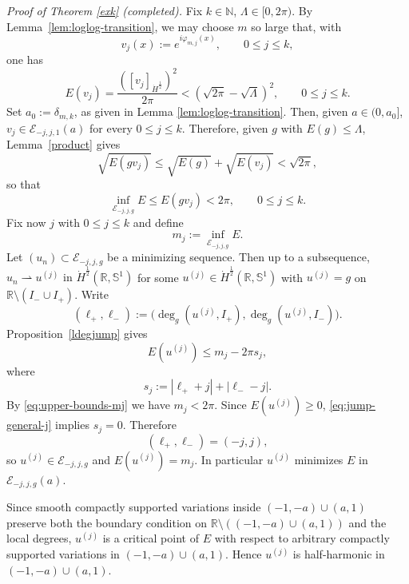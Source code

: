 \documentclass[12pt, a4paper]{article}
\newcommand{\sph}{\mathbb{S}}
\newcommand{\R}{\mathbb{R}}
\newcommand{\blu}[1]{{\color{blue}#1}}
\newcommand{\red}[1]{{\color{red}#1}}
\renewcommand{\(}{\left(}
\renewcommand{\)}{\right)}
\begin{document}
\medskip

\noindent\emph{Proof of Theorem \ref{exk} (completed).}
Fix $k\in\mathbb N$, $\Lambda\in [0,2\pi)$. By Lemma~\ref{lem:loglog-transition}, we may choose $m$ so large that, with
\[
 v_j(x):=e^{i\varphi_{m,j}(x)},\qquad 0\le j\le k,
\]
one has   $$E(v_j)=\frac{\([v_j]_{\dot H^\frac12}\)^2}{2\pi}<\(\sqrt{2\pi}-\sqrt{\Lambda}\)^2,\qquad 0\le j\le  k.$$%
Set $a_0:=\delta_{m,k}$, as given in Lemma \ref{lem:loglog-transition}. Then, given $a\in (0,a_0]$, $v_j\in {\mathcal E_{-j,j,1}(a)}$ for every {$0\le j\le k$}.
Therefore,  given $g$ with $E(g)\leq\Lambda$,
Lemma~\ref{product} gives
\[
\sqrt{E(g v_j)}\le \sqrt{E(g)}+\sqrt{E( v_j)}<\sqrt{2\pi},
\]
so that
\begin{equation}\label{eq:upper-bounds-mj}
\inf_{\mathcal E_{-j,j,g}}E\le E(g v_j)<2\pi,
\qquad 0\le j\le k.
\end{equation}
{Fix now $j$ with $0\le j\le k$ and} define
\[
m_j:=\inf_{\mathcal E_{-j,j,g}}E.
\]
Let $(u_n)\subset \mathcal E_{-j,j,g}$ be a minimizing sequence.    Then up to a subsequence, $ u_n\rightharpoonup u^{(j)}\text{ in }\dot H^{\frac12}(\mathbb R,\sph^1)$ for some $u^{(j)}\in \dot H^{\frac12}(\mathbb R,\sph^1) $ with $u^{(j)}=g$ on $\R\setminus (I_-\cup I_+)$. 
Write
\[
(\ell_+,\ell_-)
:=\bigl(\deg_g(u^{(j)},I_+),\deg_g(u^{(j)},I_-)\bigr).
\]
Proposition~\ref{ldegjump} gives
\begin{equation}\label{eq:jump-general-j}
E(u^{(j)})
\le m_j-2\pi s_j,
\end{equation}
where
\[
s_j:=|\ell_+ +j|+|\ell_- -j|.
\]
By \eqref{eq:upper-bounds-mj}  we have $m_j<2\pi$. Since $E(u^{(j)})\ge0$, \eqref{eq:jump-general-j} implies $s_j=0$. Therefore
\[
(\ell_+,\ell_-)=(-j,j),
\]
so $u^{(j)}\in \mathcal E_{-j,j,g}$ and $E(u^{(j)})=m_j$. In particular $u^{(j)}$ minimizes $E$ in $\mathcal E_{-j,j,g}(a)$.

Since smooth compactly supported variations inside $(-1,-a)\cup(a,1)$ preserve both the boundary condition on $\mathbb R\setminus ((-1,-a)\cup(a,1))$ and the local degrees, $u^{(j)}$ is a critical point of $E$ with respect to arbitrary compactly supported variations in $(-1,-a)\cup(a,1)$. Hence $u^{(j)}$ is half-harmonic in $(-1,-a)\cup(a,1)$.
\end{document}
